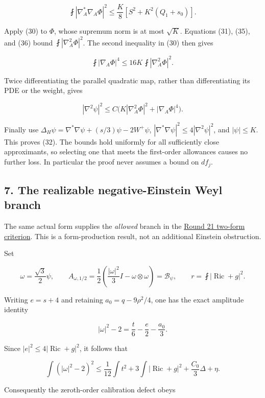 \documentclass[
  11pt,
]{article}
\begin{document}
\[
 \fint|\nabla_A^*\nabla_A\Phi|^2
 \le\frac K8\left[S^2+K^2(Q_1+s_0)\right].
 \tag{36}
\]

Apply (30) to \(\Phi\), whose supremum norm is at most \(\sqrt K\).
Equations (31), (35), and (36) bound \(\fint|\nabla_A^2\Phi|^2\). The
second inequality in (30) then gives

\[
 \fint|\nabla_A\Phi|^4
 \le16K\,\fint|\nabla_A^2\Phi|^2.
 \tag{37}
\]

Twice differentiating the parallel quadratic map, rather than
differentiating its PDE or the weight, gives

\[
 |\nabla^2\psi|^2
 \le C\bigl(K|\nabla_A^2\Phi|^2+|\nabla_A\Phi|^4\bigr).
 \tag{38}
\]

Finally use \(\Delta_H\psi=\nabla^*\nabla\psi+(s/3)\psi-2W^+\psi\),
\(|\nabla^*\nabla\psi|^2\le4|\nabla^2\psi|^2\), and \(|\psi|\le K\).
This proves (32). The bounds hold uniformly for all sufficiently close
approximants, so selecting one that meets the first-order allowances
causes no further loss. In particular the proof never assumes a bound on
\(df_j\).

\hypertarget{the-realizable-negative-einstein-weyl-branch}{%
\subsection{7. The realizable negative-Einstein Weyl
branch}\label{the-realizable-negative-einstein-weyl-branch}}

The same actual form supplies the \emph{allowed} branch in the
\href{round21_analytic.md}{Round 21 two-form criterion}. This is a
form-production result, not an additional Einstein obstruction.

Set

\[
 \omega=\frac{\sqrt3}{2}\psi,\qquad
 A_{\omega,1/2}=\frac12
       \left(\frac{|\omega|^2}{3}I-\omega\otimes\omega\right)
       =\mathcal B_\psi,
 \qquad r=\fint|\operatorname{Ric}+g|^2.
 \tag{39}
\]

Writing \(e=s+4\) and retaining \(a_0=q-9\rho^2/4\), one has the exact
amplitude identity

\[
 |\omega|^2-2=\frac t6-\frac e2-\frac{a_0}{3}.
 \tag{40}
\]

Since \(|e|^2\le4|\operatorname{Ric}+g|^2\), it follows that

\[
 \int(|\omega|^2-2)^2
 \le\frac1{12}\int t^2+3\int|\operatorname{Ric}+g|^2
                                  +\frac{C_0}{3}\Delta+\eta.
 \tag{41}
\]

Consequently the zeroth-order calibration defect obeys
\end{document}
